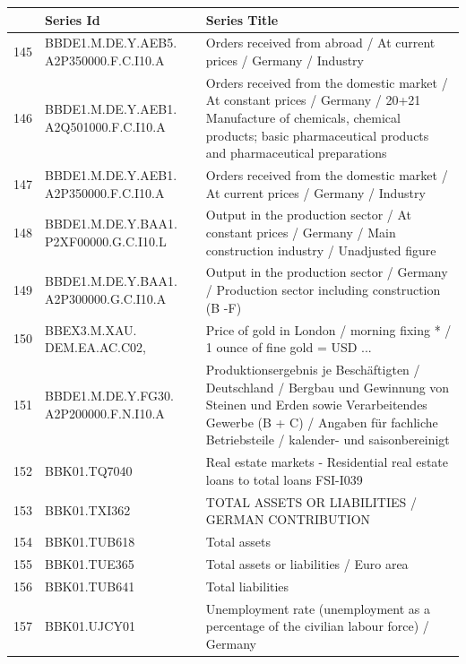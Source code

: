 \documentclass[12pt]{article}
\begin{document}
\begin{table}
\centering
\begin{tabular}{rp{5cm}p{11cm}}
& \textbf{Series Id} & \textbf{Series Title} \\
  \hline
  \hline
  145 & BBDE1.M.DE.Y.AEB5. A2P350000.F.C.I10.A & Orders received from abroad / At current prices / Germany / Industry \\ 
  \hline
  146 & BBDE1.M.DE.Y.AEB1. A2Q501000.F.C.I10.A & Orders received from the domestic market / At constant prices / Germany / 20+21 Manufacture of chemicals, chemical products; basic pharmaceutical products and pharmaceutical preparations \\ 
  \hline
  147 & BBDE1.M.DE.Y.AEB1. A2P350000.F.C.I10.A & Orders received from the domestic market / At current prices / Germany / Industry \\ 
  \hline
  148 & BBDE1.M.DE.Y.BAA1. P2XF00000.G.C.I10.L & Output in the production sector / At constant prices / Germany / Main construction industry / Unadjusted figure \\ 
  \hline
  149 & BBDE1.M.DE.Y.BAA1. A2P300000.G.C.I10.A & Output in the production sector / Germany / Production sector including construction (B -F) \\ 
  \hline
  150 & BBEX3.M.XAU. DEM.EA.AC.C02, & Price of gold in London / morning fixing * / 1 ounce of fine gold = USD ... \\ 
  \hline
  151 & BBDE1.M.DE.Y.FG30. A2P200000.F.N.I10.A & Produktionsergebnis je Beschäftigten / Deutschland / Bergbau und Gewinnung von Steinen und Erden sowie Verarbeitendes Gewerbe (B + C) / Angaben für fachliche Betriebsteile / kalender- und saisonbereinigt \\ 
  \hline
  152 & BBK01.TQ7040 & Real estate markets - Residential real estate loans to total loans                                        FSI-I039 \\ 
  \hline
  153 & BBK01.TXI362 & TOTAL ASSETS OR LIABILITIES / GERMAN CONTRIBUTION \\ 
  \hline
  154 & BBK01.TUB618 & Total assets \\ 
  \hline
  155 & BBK01.TUE365 & Total assets or liabilities / Euro area \\ 
  \hline
  156 & BBK01.TUB641 & Total liabilities \\ 
  \hline
  157 & BBK01.UJCY01 & Unemployment rate (unemployment as a percentage of the civilian labour force) / Germany \\ 
\end{tabular}
\end{table}
\end{document}
